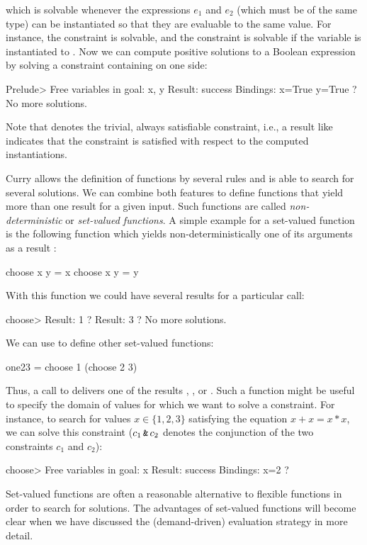which is solvable whenever the expressions $e_1$ and $e_2$
(which must be of the same type) can be instantiated so that
they are evaluable to the same value. For instance,
the constraint  is solvable, and
the constraint  is solvable if the variable 
is instantiated to . Now we can compute positive solutions
to a Boolean expression by solving a constraint containing 
on one side:
\begin{prog}
Prelude> 
Free variables in goal: x, y
Result: success
Bindings: 
x=True
y=True ? \userinput{;}
No more solutions.
\end{prog}
Note that 
denotes the trivial, always satisfiable
constraint, i.e., a result like  indicates that
the constraint is satisfied with respect to the computed instantiations.

Curry allows the definition of functions by several rules
and is able to search for several solutions. We can combine
both features to define functions that yield more than one
result for a given input. Such functions are called
\emph{non-deterministic} or \emph{set-valued functions}.%
%
A simple example for a set-valued function
is the following function  which yields
non-deterministically one of its arguments as a result
:
\begin{prog}
choose x y = x
choose x y = y
\end{prog}
With this function we could have several results for a particular call:
\begin{prog}
choose> 
Result: 1 ? \userinput{;}
Result: 3 ? \userinput{;}
No more solutions.
\end{prog}
We can use  to define other set-valued functions:
\begin{prog}
one23 = choose 1 (choose 2 3)
\end{prog}
Thus, a call to  delivers one of the results ,
, or . Such a function might be useful
to specify the domain of values for which we want to solve a
constraint. For instance, to search for values $x \in \{1,2,3\}$
satisfying the equation $x+x = x*x$, we can solve
this constraint ($c_1\,\code{\&}\,c_2$ denotes the conjunction
of the two constraints $c_1$ and $c_2$):
\begin{prog}
choose> 
Free variables in goal: x
Result: success
Bindings: 
x=2 ?
\end{prog}
Set-valued functions are often a reasonable alternative
to flexible functions in order to search for solutions.
The advantages of set-valued functions will become clear
when we have discussed the (demand-driven) evaluation strategy
in more detail.

